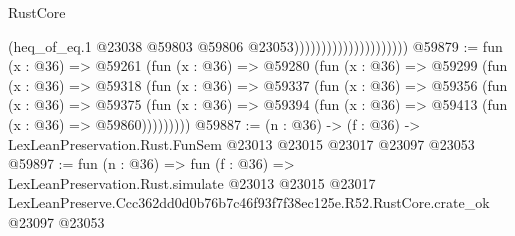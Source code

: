 \begin{lexlean}{RustCore}
\begin{coremodule}
                                            (heq_of_eq.{1}
                                              @23038
                                              @59803
                                              @59806
                                              @23053)))))))))))))))))))))
@59879 := fun (x : @36) =>
  @59261
    (fun (x : @36) =>
    @59280
      (fun (x : @36) =>
      @59299
        (fun (x : @36) =>
        @59318
          (fun (x : @36) =>
          @59337
            (fun (x : @36) =>
            @59356
              (fun (x : @36) =>
              @59375
                (fun (x : @36) => @59394 (fun (x : @36) => @59413 (fun (x : @36) => @59860)))))))))
@59887 := (n : @36) ->
  (f : @36) -> LexLeanPreservation.Rust.FunSem @23013 @23015 @23017 @23097 @23053
@59897 := fun (n : @36) =>
  fun (f : @36) =>
  LexLeanPreservation.Rust.simulate
    @23013
    @23015
    @23017
    LexLeanPreserve.Ccc362dd0d0b76b7c46f93f7f38ec125e.R52.RustCore.crate_ok
    @23097
    @23053
\end{coremodule}
\end{lexlean}
